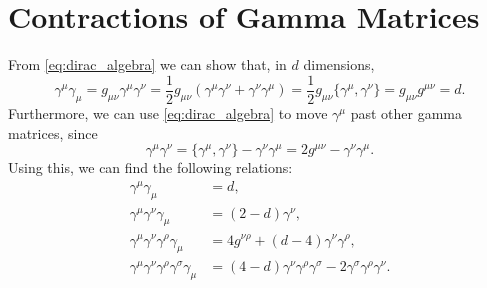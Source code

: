 \section{Contractions of Gamma Matrices}\label{app:gamma_contractions}
From \cref{eq:dirac_algebra} we can show that, in $d$ dimensions,
\begin{equation}
    \gamma^\mu\gamma_\mu = g_{\mu\nu}\gamma^\mu\gamma^\nu
    = \frac{1}{2} g_{\mu\nu}(\gamma^\mu\gamma^\nu + \gamma^\nu\gamma^\mu)
    = \frac{1}{2} g_{\mu\nu} \{\gamma^\mu,\gamma^\nu\}
    = g_{\mu\nu}g^{\mu\nu} = d.
\end{equation}
Furthermore, we can use \cref{eq:dirac_algebra} to move $\gamma^\mu$ past other gamma matrices, since
\begin{equation}
    \gamma^\mu\gamma^\nu = \{\gamma^\mu,\gamma^\nu\} - \gamma^\nu\gamma^\mu = 2g^{\mu\nu} - \gamma^\nu\gamma^\mu.
\end{equation}
Using this, we can find the following relations:
\begin{subequations}
\label{eq:gamma_contractions}
\begin{align}
    \gamma^\mu\gamma_\mu &= d,
    \label{eq:gamma_contraction_0}
    \\
    \gamma^\mu\gamma^\nu\gamma_\mu &= (2-d)\gamma^\nu,
    \label{eq:gamma_contraction_1}
    \\
    \gamma^\mu\gamma^\nu\gamma^\rho\gamma_\mu &= 4g^{\nu\rho} + (d-4) \gamma^\nu\gamma^\rho,
    \label{eq:gamma_contraction_2}
    \\
    \gamma^\mu\gamma^\nu\gamma^\rho\gamma^\sigma\gamma_\mu &= (4-d)\gamma^\nu\gamma^\rho\gamma^\sigma - 2\gamma^\sigma\gamma^\rho\gamma^\nu.
    \label{eq:gamma_contraction_3}
\end{align}
\end{subequations}


